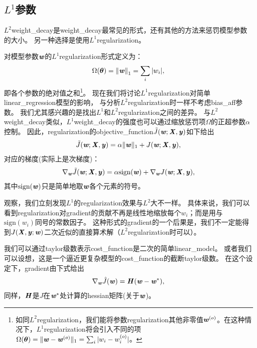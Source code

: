 \subsection{$L^1$参数}
\label{sec:l1_regularization}
$L^2$\gls{weight_decay}是\gls{weight_decay}最常见的形式，还有其他的方法来惩罚模型参数的大小。
另一种选择是使用$L^1$\gls{regularization}。

对模型参数$\boldsymbol{\mathit{w}}$的$L^1$\gls{regularization}形式定义为：
\begin{align}
 \Omega(\boldsymbol{\theta}) = \left\lVert \boldsymbol{\mathit{w}} \right\rVert_1 = \sum_i | w_i |,
 \end{align}
即各个参数的绝对值之和\footnote{如同$L^2$\gls{regularization}，我们能将参数\gls{regularization}其他非零值$\boldsymbol{\mathit{w}}^{(o)}$。在这种情况下，$L^1$\gls{regularization}将会引入不同的项$\Omega(\boldsymbol{\theta})=
\|\boldsymbol{\mathit{w}} - \boldsymbol{\mathit{w}}^{(o)} \|_1 = \sum_i | w_i - w_i^{(o)} |$。}。
现在我们将讨论$L^1$\gls{regularization}对简单\gls{linear_regression}模型的影响， 与分析$L^2$\gls{regularization}时一样不考虑\gls{bias_aff}参数。  
我们尤其感兴趣的是找出$L^1$和$L^2$\gls{regularization}之间的差异。
与$L^2$\gls{weight_decay}类似，$L^1$\gls{weight_decay}的强度也可以通过缩放惩罚项$\Omega$的正超参数$\alpha$控制。 
因此，\gls{regularization}的\gls{objective_function}$\tilde{J}(\boldsymbol{\mathit{w}};\boldsymbol{\mathit{X}}, \boldsymbol{\mathit{y}})$如下给出
\begin{align}
\tilde{J}(\boldsymbol{\mathit{w}};\boldsymbol{\mathit{X}}, \boldsymbol{\mathit{y}}) = \alpha \| \boldsymbol{\mathit{w}} \|_1 +  J(\boldsymbol{\mathit{w}};\boldsymbol{\mathit{X}}, \boldsymbol{\mathit{y}}) ,
\end{align}
对应的梯度(实际上是次梯度)：
\begin{align}
\label{eq:subgradient}
  \nabla_{\Vw} \tilde{J}(\Vw; \MX, \Vy) = \alpha \text{sign}(\Vw) + \nabla_{\Vw} J(\Vw; \MX, \Vy), %
\end{align}
其中$\text{sign}(\boldsymbol{\mathit{w}})$只是简单地取$\boldsymbol{\mathit{w}}$各个元素的符号。


观察，我们立刻发现$L^1$的\gls{regularization}效果与$L^2$大不一样。
具体来说，我们可以看到\gls{regularization}对\gls{gradient}的贡献不再是线性地缩放每个$w_i$；而是用与$\text{sign}(w_i)$同号的常数因子。
这种形式的\gls{gradient}的一个后果是，我们不一定能得到$J(\boldsymbol{\mathit{X}}, \boldsymbol{\mathit{y}};\boldsymbol{\mathit{w}})$二次近似的直接算术解（$L^2$\gls{regularization}时可以）。 
 
我们可以通过\gls{taylor}级数表示\gls{cost_function}是二次的简单\gls{linear_model}。
或者我们可以设想，这是一个逼近更复杂模型的\gls{cost_function}的截断\gls{taylor}级数。
在这个设定下，\gls{gradient}由下式给出
\begin{align}
  \nabla_{\boldsymbol{\mathit{w}}} \hat{J}(\boldsymbol{\mathit{w}}) = \boldsymbol{\mathit{H}} (\boldsymbol{\mathit{w}} - \boldsymbol{\mathit{w}}^*),
\end{align}
同样，$\boldsymbol{\mathit{H}}$是$J$在$\boldsymbol{\mathit{w}}^*$处计算的\gls{hessian}矩阵(关于$\boldsymbol{\mathit{w}}$)。

